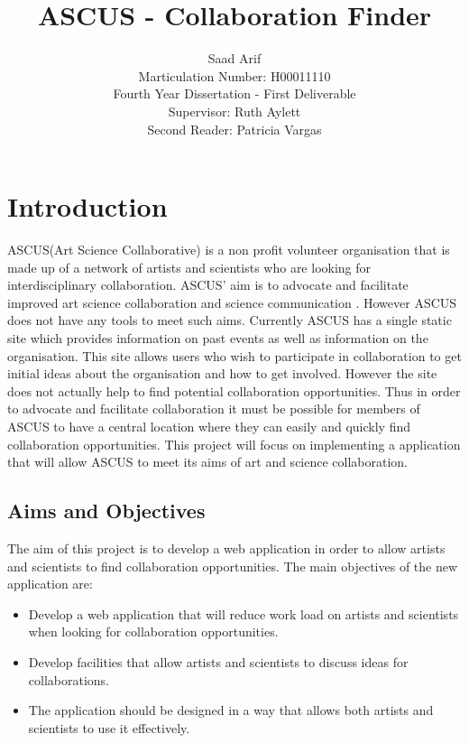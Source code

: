 \documentclass[a4paper,oneside,11pt]{report}
\begin{document}
\title{ASCUS - Collaboration Finder}
\author{Saad Arif\\ Marticulation Number: H00011110 \\Fourth Year Dissertation - First Deliverable \\ Supervisor: Ruth Aylett \\ Second Reader: Patricia Vargas}
\maketitle
\pagestyle{empty} %
\tableofcontents %
\listoffigures
{}
\pagestyle{plain} %
\listoftables
{}
\cleardoublepage %
\pagestyle{plain} %
\setcounter{page}{1} %

\chapter{Introduction}
ASCUS(Art Science Collaborative) is a non profit volunteer organisation that is made up of a network of artists and scientists who are looking for interdisciplinary collaboration. ASCUS' aim is to advocate and facilitate improved art science collaboration and science communication \autocite{ascus}. However ASCUS does not have any tools  to meet such aims. Currently ASCUS has a single static site which provides information on past events as well as information on the organisation. This site allows users who wish to participate in collaboration to get initial ideas about the organisation and how to get involved. However the site does not actually help to find potential collaboration opportunities. Thus in order to advocate and facilitate collaboration it must be possible for members of ASCUS to have a central location where they can easily and quickly find collaboration opportunities. This project will focus on implementing a application that will allow ASCUS to meet its aims of art and science collaboration.
\section{Aims and Objectives}
The aim of this project is to develop a web application in order to allow artists and scientists to find collaboration opportunities.
The main objectives of the new application are:
\begin{itemize}
	\item Develop a web application that will reduce work load on artists and scientists when looking for collaboration opportunities.
	\item Develop facilities that allow artists and scientists to discuss ideas for collaborations.
	\item The application should be designed in a way that allows both artists and scientists to use it effectively.
\end{itemize}
	
\end{document}

